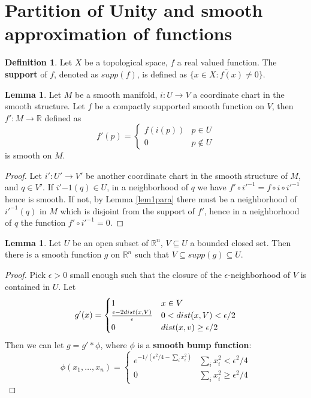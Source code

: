 \documentclass{article}
\theoremstyle{definition}
\newtheorem{lem}[thm]{Lemma}
\newtheorem{dfn}[thm]{Definition}
\begin{document}
\newpage

\section{Partition of Unity and smooth approximation of functions}

\begin{dfn}
Let $X$ be a topological space, $f$ a real valued function. The {\bf support} of $f$, denoted as $supp(f)$, is defined as $\overline{\{x\in X: f(x)\not=0\}}$.
\end{dfn}

\begin{lem}\label{lem1pu}
Let $M$ be a smooth manifold, $i: U\rightarrow V$ a coordinate chart in the smooth structure. Let $f$ be a compactly supported smooth function on $V$, then $f': M\rightarrow\mathbb{R}$ defined as 
\[f'(p)=\begin{cases} f(i(p)) & p\in U\\ 0 & p\not\in U\end{cases}\]
is smooth on $M$.
\end{lem}

\begin{proof}
    Let $i': U'\rightarrow V'$ be another coordinate chart in the smooth structure of $M$, and $q\in V'$. If $i'{-1}(q)\in U$, in a neighborhood of $q$ we have $f'\circ i'^{-1}=f\circ i\circ i'^{-1}$ hence is smooth. If not, by Lemma \ref{lem1para} there must be a neighborhood of $i'^{-1}(q)$ in $M$ which is disjoint from the support of $f'$, hence in a neighborhood of $q$ the function $f'\circ i'^{-1}=0$.
\end{proof}

\begin{lem}\label{lem2pu}
    Let $U$ be an open subset of $\mathbb{R}^n$, $V\subseteq U$ a bounded closed set. Then there is a smooth function $g$ on $\mathbb{R}^n$ such that $V\subseteq supp(g)\subseteq U$. 
\end{lem}

\begin{proof}
    Pick $\epsilon>0$ small enough such that the closure of the $\epsilon$-neighborhood of $V$ is contained in $U$. Let 
    \[g'(x)=\begin{cases}1 & x\in V\\ {\epsilon-2dist(x, V)\over \epsilon} & 0<dist(x, V)<\epsilon/2 \\ 0 & dist(x, v) \geq \epsilon/2\end{cases}\]
    Then we can let $g=g'*\phi$, where $\phi$ is a {\bf smooth bump function}:
    \[\phi(x_1, \dots, x_n)=\begin{cases}e^{-1/(\epsilon^2/4-\sum_i x_i^2)} & \sum_i x_i^2<\epsilon^2/4 \\ 0 & \sum_i x_i^2\geq \epsilon^2/4\end{cases}\]
\end{proof}
\end{document}
